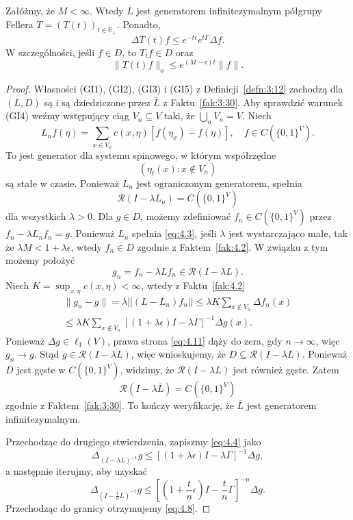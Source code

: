 \documentclass{article}
\begin{document}
\begin{thm} \label{thm:4.3}
	Załóżmy, że $M < \infty$. 
	Wtedy $\overline{L}$ jest generatorem infinitezymalnym półgrupy 
	Fellera $T=(T(t))_{t \in \mathbb{R}_+}$. 
	Ponadto,
	\begin{equation}\label{eq:4.8}
		\Delta T(t)f \leq e^{-t \epsilon} e^{t \Gamma} \Delta f.
	\end{equation}
	W szczególności, jeśli $f \in D$, to $T_tf \in D$ oraz
	\begin{equation}\label{eq:4.9}
		\|T(t)f\|_o \leq e^{(M - \epsilon)t} \|f\|.
	\end{equation}
\end{thm}

\begin{proof}
	Własności (GI1), (GI2), (GI3) i (GI5) z Definicji~\ref{defn:3:12} 
	zachodzą dla $(L, D)$ są  i są dziedziczone przez $\overline{L}$ z Faktu~\ref{fak:3:30}. 
	Aby sprawdzić warunek (GI4) weźmy  wstępujący ciąg $V_n\subseteq V$ taki, że
	$\bigcup_nV_n=V$. Niech
	\begin{equation}\label{eq:4.10}
		L_n f(\eta) = 
		\sum_{x \in V_n} c(x, \eta) [f(\eta_x) - f(\eta)], 
		\quad f \in C(\{0,1\}^V).
	\end{equation}
	To jest generator dla systemu spinowego, w którym współrzędne
	\[
		(\eta_t(x) : x \notin V_n)
	\]
	są stałe w czasie. 
	Ponieważ $L_n$ jest ograniczonym generatorem, spełnia
	\[
		\mathcal{R}(I - \lambda L_n) = C(\{0,1\}^V)
	\]
	dla wszystkich $\lambda > 0$. 
	Dla $g \in D$, możemy zdefiniować $f_n \in C(\{0,1\}^V)$ 
	przez $f_n - \lambda L_n f_n = g$. 
	Ponieważ $L_n$ spełnia \eqref{eq:4.3}, jeśli $\lambda$ jest wystarczająco małe, 
	tak że $\lambda M < 1 + \lambda \epsilon$, wtedy $f_n \in D$ zgodnie z Faktem~\ref{fak:4.2}. 
	W związku z tym możemy położyć
	\[
		g_n = f_n - \lambda L f_n \in \mathcal{R}(I - \lambda L).
	\]
	Niech $K = \sup_{x, \eta} c(x, \eta) <\infty$, wtedy z Faktu~\ref{fak:4.2}
	\begin{multline}\label{eq:4.11}
		\|g_n - g\| 
		= \lambda ||(L - L_n) f_n|| 
		\leq \lambda K \sum_{x \notin V_n} \Delta f_n(x)\\
		\leq \lambda K \sum_{x \notin V_n} 
		\left[ (1 + \lambda \epsilon)I - \lambda \Gamma \right]^{-1} \Delta g(x).
	\end{multline}
	Ponieważ $\Delta g \in \ell_1(V)$, prawa strona \eqref{eq:4.11} 
	dąży do zera, gdy $n \to \infty$, więc $g_n \to g$. 
	Stąd $g \in \mathcal{R}(I - \lambda L)$, więc wnioskujemy, 
	że $D \subseteq \mathcal{R}(I - \lambda L)$. 
	Ponieważ $D$ jest gęste w $C(\{0,1\}^V)$, 
	widzimy, że $\mathcal{R}(I - \lambda L)$ jest również gęste. Zatem
	\[
		\mathcal{R}(I - \lambda \overline{L}) = C(\{0,1\}^V)
	\]
	zgodnie z Faktem~\ref{fak:3:30}. 
	To kończy weryfikację, że $\overline{L}$ jest generatorem infinitezymalnym.


	Przechodząc do drugiego stwierdzenia, zapiszmy \eqref{eq:4.4} jako
	\[
		\Delta_{(I - \lambda L)^{-1}} g 
		\leq \left[ (1 + \lambda \epsilon)I - \lambda \Gamma \right]^{-1} \Delta g,
	\]
	a następnie iterujmy, aby uzyskać
	\[
		\Delta_{(I - \frac{t}{n} L)^{-1}} g \leq 
		\left[ \left( 1 + \frac{t}{n} \epsilon \right) I - \frac{t}{n} \Gamma \right]^{-n} 
		\Delta g.
	\]
	Przechodząc do granicy otrzymujemy \eqref{eq:4.8}.
\end{proof}
\end{document}
